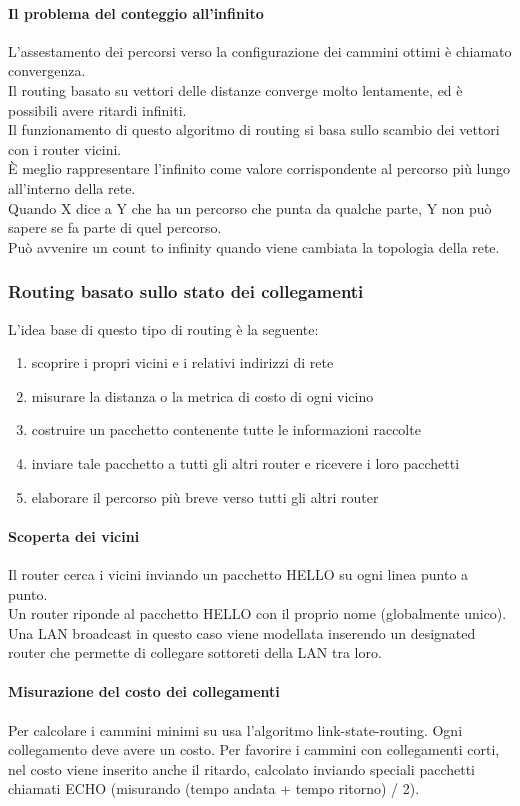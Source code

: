\documentclass{article}
\begin{document}
\paragraph{Il problema del conteggio all'infinito}
L'assestamento dei percorsi verso la configurazione dei cammini ottimi è chiamato convergenza.\\
Il routing basato su vettori delle distanze converge molto lentamente, ed è possibili avere ritardi infiniti. \\
Il funzionamento di questo algoritmo di routing si basa sullo scambio dei vettori con i router vicini. \\
È meglio rappresentare l'infinito come valore corrispondente al percorso più lungo all'interno della rete.\\
Quando X dice a Y che ha un percorso che punta da qualche parte, Y non può sapere se fa parte di quel percorso.\\
Può avvenire un count to infinity quando viene cambiata la topologia della rete.
\subsubsection{Routing basato sullo stato dei collegamenti}
L'idea base di questo tipo di routing è la seguente:
\begin{enumerate}
    \item scoprire i propri vicini e i relativi indirizzi di rete
    \item misurare la distanza o la metrica di costo di ogni vicino
    \item costruire un pacchetto contenente tutte le informazioni raccolte
    \item inviare tale pacchetto a tutti gli altri router e ricevere i loro pacchetti
    \item elaborare il percorso più breve verso tutti gli altri router
\end{enumerate}
\paragraph{Scoperta dei vicini}
Il router cerca i vicini inviando un pacchetto HELLO su ogni linea punto a punto. \\
Un router riponde al pacchetto HELLO con il proprio nome (globalmente unico).\\
Una LAN broadcast in questo caso viene modellata inserendo un designated router che permette di collegare sottoreti della LAN tra loro.
\paragraph{Misurazione del costo dei collegamenti}
Per calcolare i cammini minimi su usa l'algoritmo link-state-routing. Ogni collegamento deve avere un costo. Per favorire i cammini con collegamenti corti, nel costo viene inserito anche il ritardo, calcolato inviando speciali pacchetti chiamati ECHO (misurando (tempo andata + tempo ritorno) / 2).
\end{document}
